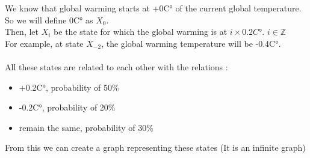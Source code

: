 \documentclass{article}
\begin{document}

    We know that global warming starts at +0C° of the current global temperature.\\
    So we will define 0C° as $X_0$.\\
    Then, let $X_i$ be the state for which the global warming is at $i\times0.2C°$. $i\in \mathbb{Z}$\\
    For example, at state $X_{-2}$, the global warming temperature will be -0.4C°.\\
    \\
    All these states are related to each other with the relations :
    \begin{itemize}
        \item +0.2C°, probability of 50\%
        \item -0.2C°, probability of 20\%
        \item remain the same, probability of 30\%
    \end{itemize}
    From this we can create a graph representing these states (It is an infinite graph)
\end{document}
